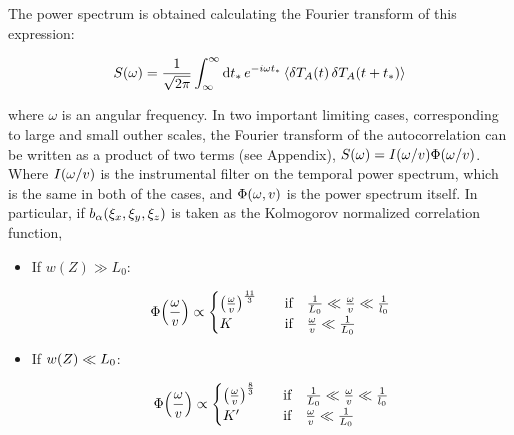 The power spectrum is obtained calculating the Fourier transform of this
expression:

\begin{equation}
        S\qty(\omega) = \frac{1}{\sqrt{2\pi}} \int^\infty_\infty \dd{t_*}
        e^{-i\omega t_*} \expval{\var{T_A\qty(t)}\var{T_A\qty(t + t_*)}}
\end{equation}

where $\omega$ is an angular frequency. In two important limiting cases,
corresponding to large and small outher scales, the
Fourier transform of the
autocorrelation can be written as a product of two terms (see Appendix),
$S\qty(\omega) = I\qty(\omega/v)\Phi\qty(\omega/v)$. Where
$I\qty(\omega/v)$ is the instrumental filter on the temporal power spectrum,
which is the same in both of the cases,
and $\Phi\qty(\omega,v)$ is the power spectrum itself. In particular, if
$b_\alpha\qty(\xi_x,\xi_y,\xi_z)$ is taken as the Kolmogorov normalized
correlation function,

\begin{itemize}
        \item If $w(Z) \gg L_0$:

        \begin{equation}
                \Phi\qty(\frac{\omega}{v}) \propto
                        \begin{cases}
                                \qty(\frac{\omega}{v})^{\frac{11}{3}} & \qif
                                \frac{1}{L_0} \ll \frac{\omega}{v}
                                \ll \frac{1}{l_0} \\
                                K & \qif \frac{\omega}{v} \ll \frac{1}{L_0}
                        \end{cases}
        \end{equation}

        \item If $w\qty(Z) \ll L_0$:

        \begin{equation}
                \Phi\qty(\frac{\omega}{v}) \propto
                        \begin{cases}
                                \qty(\frac{\omega}{v})^{\frac{8}{3}} & \qif
                                \frac{1}{L_0} \ll \frac{\omega}{v}
                                \ll \frac{1}{l_0} \\
                                K' & \qif \frac{\omega}{v} \ll \frac{1}{L_0}
                        \end{cases}
        \end{equation}
\end{itemize}

